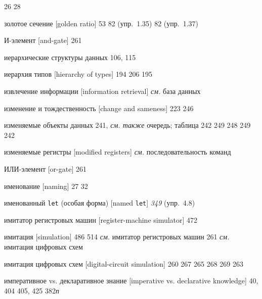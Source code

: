 \begin{theindex}
   26
   28
\item {золотое сечение [golden ratio]} 53
   82 (упр.~1.35)
   82 (упр.~1.37)
\bigskip
\item {И-элемент [and-gate]} 261
\item {иерархические структуры данных} 106, 115
\item {иерархия типов [hierarchy of types]} 194
   206
   195
\item {извлечение информации [information retrieval]} {\it см.} база данных
\item {изменение и тождественность [change and sameness]}
   223
   246
\item {изменяемые объекты данных} 241, {\it см. также} очередь; таблица
   242
   249
   248
   249
   242
\item {изменяемые регистры [modified registers]} {\it см.} последовательность команд
\item {ИЛИ-элемент [or-gate]} 261
\item {именование [naming]}
   27
   32
\item {именованный \texttt{let} (особая форма) [named {\tt let}]} {\it 349} (упр.~4.8)
\item {имитатор регистровых машин [register-machine simulator]} 472
\item {имитация [simulation]}
   486
   514
   {\it см.} имитатор регистровых машин
   261
   {\it см.} имитация цифровых схем
\item {имитация цифровых схем [digital-circuit simulation]} 260
   267
   265
   268
   269
   263
\item {императивное vs. декларативное знание [imperative vs. declarative knowledge]} 40, 404
   405, 425
   382{\it п}

\end{theindex}
